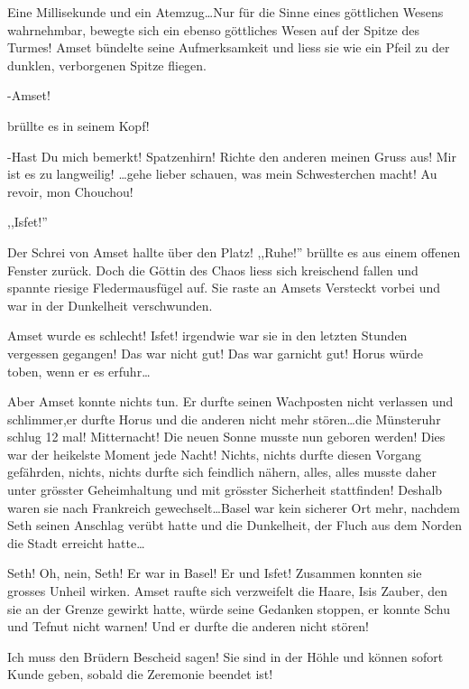 Eine Millisekunde und ein Atemzug\dots Nur für die Sinne eines göttlichen Wesens wahrnehmbar, bewegte sich ein ebenso göttliches Wesen auf der Spitze des Turmes! Amset bündelte seine Aufmerksamkeit und liess sie wie ein Pfeil zu der dunklen, verborgenen Spitze fliegen.

\begin{Large}
-Amset!
\end{Large}
 brüllte es in seinem Kopf!
 \begin{Large}
 -Hast Du mich bemerkt! Spatzenhirn! Richte den anderen meinen Gruss aus! Mir ist es zu langweilig! \dots gehe lieber schauen, was mein Schwesterchen macht! Au revoir, mon Chouchou!
 \end{Large}
 
 
\begin{Large}
,,Isfet!''
\end{Large}

Der Schrei von Amset hallte über den Platz! ,,Ruhe!'' brüllte es aus einem offenen Fenster zurück. Doch die Göttin des Chaos liess sich kreischend fallen und spannte riesige Fledermausfügel auf. Sie raste an Amsets Versteckt vorbei und war in der Dunkelheit verschwunden.

Amset wurde es schlecht! Isfet! irgendwie war sie in den letzten Stunden vergessen gegangen! Das war nicht gut! Das war garnicht gut! Horus würde toben, wenn er es erfuhr\dots

Aber Amset konnte nichts tun. Er durfte seinen Wachposten nicht verlassen und schlimmer,er durfte Horus und die anderen nicht mehr stören\dots die Münsteruhr schlug 12 mal! Mitternacht! Die neuen Sonne musste nun geboren werden! Dies war der heikelste Moment jede Nacht! Nichts, nichts durfte diesen Vorgang gefährden, nichts, nichts durfte sich feindlich nähern, alles, alles musste daher unter grösster Geheimhaltung und mit grösster Sicherheit stattfinden! Deshalb waren sie nach Frankreich gewechselt\dots Basel war kein sicherer Ort mehr, nachdem Seth seinen Anschlag verübt hatte und die Dunkelheit, der Fluch aus dem Norden die Stadt erreicht hatte\dots

Seth! Oh, nein, Seth! Er war in Basel! Er und Isfet! Zusammen konnten sie grosses Unheil wirken. Amset raufte sich verzweifelt die Haare, Isis Zauber, den sie an der Grenze gewirkt hatte, würde seine Gedanken stoppen, er konnte Schu und Tefnut nicht warnen! Und er durfte die anderen nicht stören!

Ich muss den Brüdern Bescheid sagen! Sie sind in der Höhle und können sofort Kunde geben, sobald die Zeremonie beendet ist!

